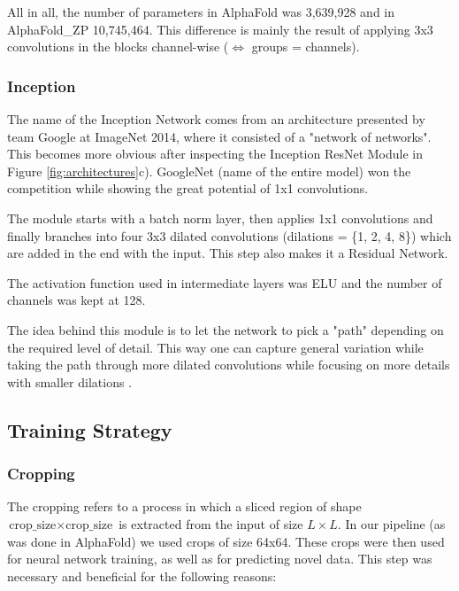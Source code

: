 All in all, the number of parameters in AlphaFold was 3,639,928 and in AlphaFold\_ZP 10,745,464. This difference is mainly the result of applying 3x3 convolutions in the blocks channel-wise ($\Longleftrightarrow$ groups = channels).

\subsubsection{Inception}

The name of the Inception Network comes from an architecture presented by team Google at ImageNet 2014, where it consisted of a "network of networks".
This becomes more obvious after inspecting the Inception ResNet Module in Figure \ref{fig:architectures}c). GoogleNet (name of the entire model) won the competition while showing the great potential of 1x1 convolutions.

The module starts with a batch norm layer, then applies 1x1 convolutions and finally branches into four 3x3 dilated convolutions (dilations = \{1, 2, 4, 8\}) which are added in the end with the input. This step also makes it a Residual Network.

The activation function used in intermediate layers was ELU and the number of channels was kept at 128.

The idea behind this module is to let the network to pick a "path" depending on the required level of detail. This way one can capture general variation while taking the path through more dilated convolutions while focusing on more details with smaller dilations \cite{nn_dl}.

\subsection{Training Strategy}

\subsubsection{Cropping}

The cropping refers to a process in which a sliced region of shape $\text{crop\_size} \times \text{crop\_size}$ is extracted from the input of size $L \times L$. 
In our pipeline (as was done in AlphaFold) we used crops of size 64x64.
These crops were then used for neural network training, as well as for predicting novel data. This step was necessary and beneficial for the following reasons: 

